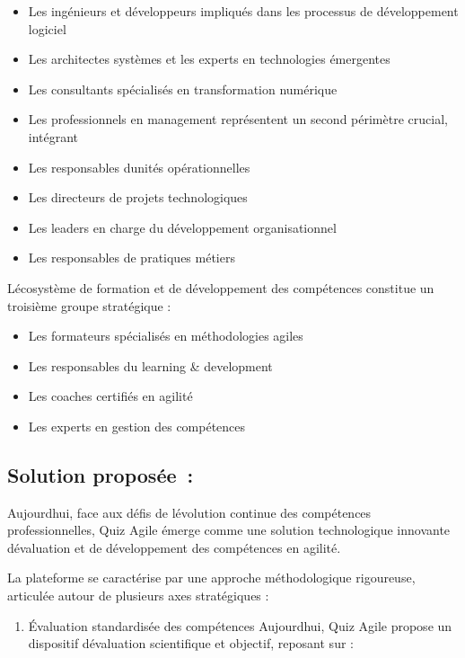 \documentclass[12pt,a4paper,twoside]{report}
\begin{document}
\begin{itemize}
\item
  Les ingénieurs et développeurs impliqués dans les processus de
  développement logiciel
\item
  Les architectes systèmes et les experts en technologies émergentes
\item
  Les consultants spécialisés en transformation numérique
\item
  Les professionnels en management représentent un second périmètre
  crucial, intégrant
\item
  Les responsables d\textquotesingle unités opérationnelles
\item
  Les directeurs de projets technologiques
\item
  Les leaders en charge du développement organisationnel
\item
  Les responsables de pratiques métiers
\end{itemize}

L\textquotesingle écosystème de formation et de développement des
compétences constitue un troisième groupe stratégique :

\begin{itemize}
\item
  Les formateurs spécialisés en méthodologies agiles
\item
  Les responsables du learning \& development
\item
  Les coaches certifiés en agilité
\item
  Les experts en gestion des compétences
\end{itemize}

\hypertarget{solution-proposuxe9e}{%
\subsection{Solution proposée~:}\label{solution-proposuxe9e}}

Aujourd\textquotesingle hui, face aux défis de
l\textquotesingle évolution continue des compétences professionnelles,
Quiz Agile émerge comme une solution technologique innovante
d\textquotesingle évaluation et de développement des compétences en
agilité.

La plateforme se caractérise par une approche méthodologique rigoureuse,
articulée autour de plusieurs axes stratégiques :

\begin{enumerate}
\def\labelenumi{\arabic{enumi}.}
\item
  Évaluation standardisée des compétences Aujourd\textquotesingle hui,
  Quiz Agile propose un dispositif d\textquotesingle évaluation
  scientifique et objectif, reposant sur :
\end{enumerate}
\end{document}

